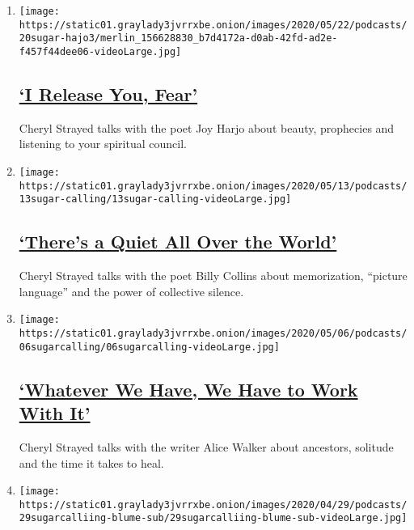 \begin{enumerate}
\def\labelenumi{\arabic{enumi}.}
\item
  \texttt{[image: https://static01.graylady3jvrrxbe.onion/images/2020/05/22/podcasts/20sugar-hajo3/merlin\_156628830\_b7d4172a-d0ab-42fd-ad2e-f457f44dee06-videoLarge.jpg]}

  \hypertarget{i-release-you-fear}{%
  \subsection{\texorpdfstring{\href{/2020/05/20/podcasts/sugar-calling-joy-harjo-poetry-virus.html}{`I
  Release You,
  Fear'}}{`I Release You, Fear'}}\label{i-release-you-fear}}

  Cheryl Strayed talks with the poet Joy Harjo about beauty, prophecies
  and listening to your spiritual council.
\item
  \texttt{[image: https://static01.graylady3jvrrxbe.onion/images/2020/05/13/podcasts/13sugar-calling/13sugar-calling-videoLarge.jpg]}

  \hypertarget{theres-a-quiet-all-over-the-world}{%
  \subsection{\texorpdfstring{\href{/2020/05/13/podcasts/sugar-calling-billy-collins-poetry-virus.html}{`There's
  a Quiet All Over the
  World'}}{`There's a Quiet All Over the World'}}\label{theres-a-quiet-all-over-the-world}}

  Cheryl Strayed talks with the poet Billy Collins about memorization,
  ``picture language'' and the power of collective silence.
\item
  \texttt{[image: https://static01.graylady3jvrrxbe.onion/images/2020/05/06/podcasts/06sugarcalling/06sugarcalling-videoLarge.jpg]}

  \hypertarget{whatever-we-have-we-have-to-work-with-it}{%
  \subsection{\texorpdfstring{\href{/2020/05/06/podcasts/sugar-calling-alice-walker-quarantine-virus.html}{`Whatever
  We Have, We Have to Work With
  It'}}{`Whatever We Have, We Have to Work With It'}}\label{whatever-we-have-we-have-to-work-with-it}}

  Cheryl Strayed talks with the writer Alice Walker about ancestors,
  solitude and the time it takes to heal.
\item
  \texttt{[image: https://static01.graylady3jvrrxbe.onion/images/2020/04/29/podcasts/29sugarcalliing-blume-sub/29sugarcalliing-blume-sub-videoLarge.jpg]}


\end{enumerate}
